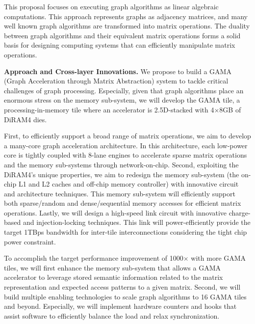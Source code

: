\noindent
This proposal focuses on executing graph algorithms as linear algebraic computations. 
This approach represents graphs as adjacency matrices, and many well known graph algorithms are transformed into matrix operations. 
The %
duality between graph algorithms and their equivalent matrix operations forms a solid basis for designing computing systems that can efficiently manipulate matrix operations. 

\vspace{3pt}
\noindent
\textbf{Approach and Cross-layer Innovations.} 
We propose to build a GAMA (Graph Acceleration through Matrix Abstraction) system to tackle critical challenges of graph processing. 
Especially, given that graph algorithms place an enormous stress on the memory sub-system, 
we will develop the GAMA tile, a processing-in-memory tile where an accelerator is 2.5D-stacked with 4$\times$8GB of DiRAM4 dies.

First, to efficiently support a broad range of matrix operations, we aim to develop a many-core graph acceleration architecture. 
In this architecture, each low-power core is tightly coupled with 8-lane engines to accelerate sparse matrix operations and the memory sub-systems through network-on-chip.
Second, exploiting the DiRAM4's unique properties, we aim to redesign the memory sub-system (the on-chip L1 and L2 caches and off-chip memory controller) with innovative circuit and architecture techniques. 
This memory sub-system will efficiently support both sparse/random and dense/sequential memory accesses for efficient matrix operations. 
Lastly, we will design a high-speed link circuit with innovative charge-based and injection-locking techniques. 
This link will power-efficiently provide the target 1TBps bandwidth for inter-tile interconnections considering the tight chip power constraint.


To accomplish the target performance improvement of 1000$\times$ with more GAMA tiles, %
we will first enhance the memory sub-system that allows a GAMA accelerator to leverage 
stored semantic information related to the matrix representation and expected access patterns to a given matrix.   
Second, we will build multiple enabling technologies to scale graph algorithms to 16 GAMA tiles and beyond. 
Especially, we will implement hardware counters and hooks that assist software to efficiently balance the load and relax synchronization.


